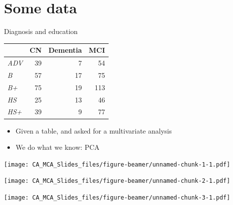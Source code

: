 \documentclass[
  ignorenonframetext,
]{beamer}
\providecommand{\tightlist}{%
  \setlength{\itemsep}{0pt}\setlength{\parskip}{0pt}}
\begin{document}
\hypertarget{some-data}{%
\section{Some data}\label{some-data}}

\begin{frame}{Diagnosis and education}
\protect\hypertarget{diagnosis-and-education}{}

\begin{table}[H]
\centering
\begin{tabular}{>{\em}lrrr}
\toprule
  & CN & Dementia & MCI\\
\midrule
ADV & 39 & 7 & 54\\
B & 57 & 17 & 75\\
B+ & 75 & 19 & 113\\
HS & 25 & 13 & 46\\
HS+ & 39 & 9 & 77\\
\bottomrule
\end{tabular}
\end{table}

\end{frame}

\begin{frame}

\begin{itemize}[<+->]
\tightlist
\item
  Given a table, and asked for a multivariate analysis
\item
  We do what we know: PCA
\end{itemize}

\end{frame}

\begin{frame}

\texttt{[image: CA\_MCA\_Slides\_files/figure-beamer/unnamed-chunk-1-1.pdf]}

\end{frame}

\begin{frame}

\texttt{[image: CA\_MCA\_Slides\_files/figure-beamer/unnamed-chunk-2-1.pdf]}

\end{frame}

\begin{frame}

\texttt{[image: CA\_MCA\_Slides\_files/figure-beamer/unnamed-chunk-3-1.pdf]}

\end{frame}
\end{document}
